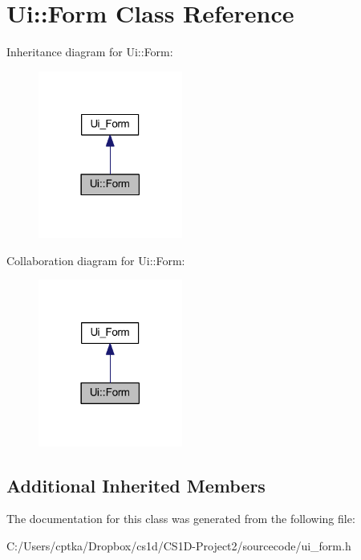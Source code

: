 \hypertarget{class_ui_1_1_form}{}\section{Ui\+:\+:Form Class Reference}
\label{class_ui_1_1_form}


Inheritance diagram for Ui\+:\+:Form\+:
\nopagebreak
\begin{figure}[H]
\begin{center}
\leavevmode
\includegraphics[width=134pt]{class_ui_1_1_form__inherit__graph}
\end{center}
\end{figure}


Collaboration diagram for Ui\+:\+:Form\+:
\nopagebreak
\begin{figure}[H]
\begin{center}
\leavevmode
\includegraphics[width=134pt]{class_ui_1_1_form__coll__graph}
\end{center}
\end{figure}
\subsection*{Additional Inherited Members}


The documentation for this class was generated from the following file\+:\begin{DoxyCompactItemize}
\item 
C\+:/\+Users/cptka/\+Dropbox/cs1d/\+C\+S1\+D-\/\+Project2/sourcecode/ui\+\_\+form.\+h\end{DoxyCompactItemize}

